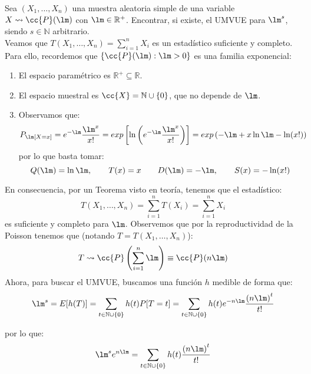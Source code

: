 \begin{ejercicio}
    Sea $(X_1, \ldots, X_n)$ una muestra aleatoria simple de una variable $X\rightsquigarrow \cc{P}(\lm)$ con $\lm\in \mathbb{R}^+$. Encontrar, si existe, el UMVUE para $\lm^s$, siendo $s\in \mathbb{N}$ arbitrario.\\
    
    \noindent
    Veamos que $T(X_1, \ldots, X_n) = \sum\limits_{i=1}^{n}X_i$ es un estadístico suficiente y completo. Para ello, recordemos que $\{\cc{P}(\lm) : \lm>0\}$ es una familia exponencial:
    \begin{enumerate}
        \item El espacio paramétrico es $\mathbb{R}^+ \subseteq \mathbb{R}$.
        \item El espacio muestral es $\cc{X}=\mathbb{N}\cup \{0\}$, que no depende de $\lm$.
        \item Observamos que:
            \begin{align*}
                P_\lm[X=x] &= e^{-\lm}\dfrac{\lm^x}{x!} = exp\left[\ln\left(e^{-\lm}\dfrac{\lm^x}{x!}\right)\right] = exp\left(-\lm + x\ln\lm -\ln(x!)\right)
            \end{align*}
            por lo que basta tomar:
            \begin{equation*}
                Q(\lm) = \ln\lm, \qquad T(x) = x \qquad D(\lm) = -\lm, \qquad S(x) = -\ln(x!)
            \end{equation*}
    \end{enumerate}
    En consecuencia, por un Teorema visto en teoría, tenemos que el estadístico:
    \begin{equation*}
        T(X_1, \ldots, X_n) = \sum_{i=1}^{n}T(X_i) = \sum_{i=1}^{n}X_i
    \end{equation*}
    es suficiente y completo para $\lm$. Observemos que por la reproductividad de la Poisson tenemos que (notando $T=T(X_1, \ldots, X_n)$): 
    \begin{equation*}
        T\rightsquigarrow \cc{P}\left(\sum_{i=1}^{n}\lm\right) \equiv \cc{P}(n\lm)
    \end{equation*}
    Ahora, para buscar el UMVUE, buscamos una función $h$ medible de forma que:
    \begin{equation*}
        \lm^s = E[h(T)] = \sum_{t\in \mathbb{N}\cup \{0\}}h(t)P[T=t] = \sum_{t\in \mathbb{N}\cup \{0\}} h(t) e^{-n\lm} \dfrac{{(n\lm)}^{t}}{t!} 
    \end{equation*}

    por lo que:
    \begin{equation*}
        \lm^s e^{n\lm} = \sum_{t\in \mathbb{N}\cup \{0\}} h(t)\dfrac{{(n\lm)}^{t}}{t!}
    \end{equation*}


\end{ejercicio}
